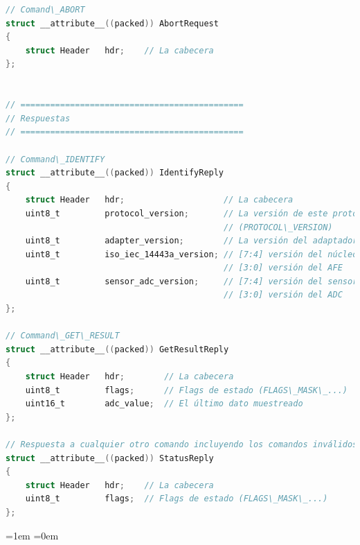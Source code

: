 \documentclass[a4paper, twoside, 11pt]{report}
\begin{document}
\begin{lstlisting}[language=C, style=CStyle, texcl=true]
// Comand\_ABORT
struct __attribute__((packed)) AbortRequest
{
    struct Header   hdr;    // La cabecera
};


// =============================================
// Respuestas
// =============================================

// Command\_IDENTIFY
struct __attribute__((packed)) IdentifyReply
{
    struct Header   hdr;                    // La cabecera
    uint8_t         protocol_version;       // La versión de este protocolo
                                            // (PROTOCOL\_VERSION)
    uint8_t         adapter_version;        // La versión del adaptador (adapter.sv)
    uint8_t         iso_iec_14443a_version; // [7:4] versión del núcleo IP digital
                                            // [3:0] versión del AFE
    uint8_t         sensor_adc_version;     // [7:4] versión del sensor
                                            // [3:0] versión del ADC
};

// Command\_GET\_RESULT
struct __attribute__((packed)) GetResultReply
{
    struct Header   hdr;        // La cabecera
    uint8_t         flags;      // Flags de estado (FLAGS\_MASK\_...)
    uint16_t        adc_value;  // El último dato muestreado
};

// Respuesta a cualquier otro comando incluyendo los comandos inválidos.
struct __attribute__((packed)) StatusReply
{
    struct Header   hdr;    // La cabecera
    uint8_t         flags;  // Flags de estado (FLAGS\_MASK\_...)
};
\end{lstlisting}



\FloatBarrier
\newpage

\emergencystretch=1em
\printbibliography
\emergencystretch=0em
\end{document}

